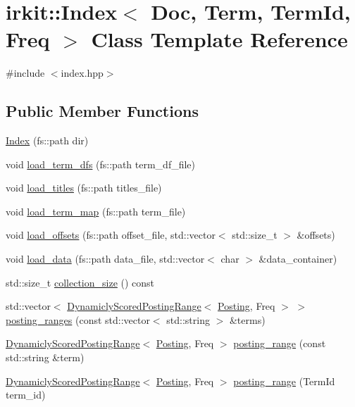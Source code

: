\hypertarget{classirkit_1_1Index}{}\section{irkit\+:\+:Index$<$ Doc, Term, Term\+Id, Freq $>$ Class Template Reference}
\label{classirkit_1_1Index}


{\ttfamily \#include $<$index.\+hpp$>$}

\subsection*{Public Member Functions}
\begin{DoxyCompactItemize}
\item 
\hyperlink{classirkit_1_1Index_a38ba1f601738f30be7d38232cd172f16}{Index} (fs\+::path dir)
\item 
void \hyperlink{classirkit_1_1Index_af8a4dd64292b2b7f7359ef1e62d75147}{load\+\_\+term\+\_\+dfs} (fs\+::path term\+\_\+df\+\_\+file)
\item 
void \hyperlink{classirkit_1_1Index_acd33c3a279e165a71594843d70e281f1}{load\+\_\+titles} (fs\+::path titles\+\_\+file)
\item 
void \hyperlink{classirkit_1_1Index_a2071c83ea3a4f128ea624fea8a24c9c9}{load\+\_\+term\+\_\+map} (fs\+::path term\+\_\+file)
\item 
void \hyperlink{classirkit_1_1Index_a1d44636a2174a740a9e648d2587254a6}{load\+\_\+offsets} (fs\+::path offset\+\_\+file, std\+::vector$<$ std\+::size\+\_\+t $>$ \&offsets)
\item 
void \hyperlink{classirkit_1_1Index_ad3f9d2490c25541bb7906cb17f76a0c2}{load\+\_\+data} (fs\+::path data\+\_\+file, std\+::vector$<$ char $>$ \&data\+\_\+container)
\item 
std\+::size\+\_\+t \hyperlink{classirkit_1_1Index_a45ede4e9e43c8a813d13467d97c084a1}{collection\+\_\+size} () const
\item 
std\+::vector$<$ \hyperlink{classirkit_1_1DynamiclyScoredPostingRange}{Dynamicly\+Scored\+Posting\+Range}$<$ \hyperlink{structirkit_1_1__Posting}{Posting}, Freq $>$ $>$ \hyperlink{classirkit_1_1Index_a95b2c99d94538638d93e990152e09cab}{posting\+\_\+ranges} (const std\+::vector$<$ std\+::string $>$ \&terms)
\item 
\hyperlink{classirkit_1_1DynamiclyScoredPostingRange}{Dynamicly\+Scored\+Posting\+Range}$<$ \hyperlink{structirkit_1_1__Posting}{Posting}, Freq $>$ \hyperlink{classirkit_1_1Index_adf8d2508d3f7a5085468b3dc8e25036b}{posting\+\_\+range} (const std\+::string \&term)
\item 
\hyperlink{classirkit_1_1DynamiclyScoredPostingRange}{Dynamicly\+Scored\+Posting\+Range}$<$ \hyperlink{structirkit_1_1__Posting}{Posting}, Freq $>$ \hyperlink{classirkit_1_1Index_a1b906859b75305b79835a2f0955168b9}{posting\+\_\+range} (Term\+Id term\+\_\+id)
\end{DoxyCompactItemize}



